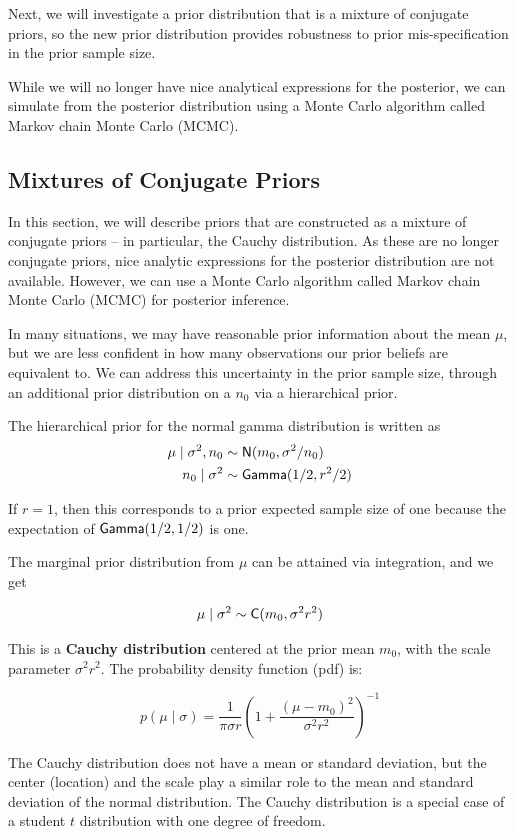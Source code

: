 \documentclass[]{book}
\theoremstyle{definition}
\theoremstyle{definition}
\theoremstyle{definition}
\theoremstyle{remark}
\begin{document}
Next, we will investigate a prior distribution that is a mixture of
conjugate priors, so the new prior distribution provides robustness to
prior mis-specification in the prior sample size.

While we will no longer have nice analytical expressions for the
posterior, we can simulate from the posterior distribution using a Monte
Carlo algorithm called Markov chain Monte Carlo (MCMC).

\subsection{Mixtures of Conjugate Priors}\label{sec:NG-Cauchy}

In this section, we will describe priors that are constructed as a
mixture of conjugate priors -- in particular, the Cauchy distribution.
As these are no longer conjugate priors, nice analytic expressions for
the posterior distribution are not available. However, we can use a
Monte Carlo algorithm called Markov chain Monte Carlo (MCMC) for
posterior inference.

In many situations, we may have reasonable prior information about the
mean \(\mu\), but we are less confident in how many observations our
prior beliefs are equivalent to. We can address this uncertainty in the
prior sample size, through an additional prior distribution on a \(n_0\)
via a hierarchical prior.

The hierarchical prior for the normal gamma distribution is written as
\[\begin{aligned}
\mu \mid \sigma^2, n_0 & \sim \textsf{N}(m_0, \sigma^2/n_0) \\
n_0 \mid \sigma^2 &  \sim \textsf{Gamma}(1/2, r^2/2)
\end{aligned}\]

If \(r=1\), then this corresponds to a prior expected sample size of one
because the expectation of \(\textsf{Gamma}(1/2,1/2)\) is one.

The marginal prior distribution from \(\mu\) can be attained via
integration, and we get

\[\mu \mid \sigma^2  \sim  \textsf{C}(m_0, \sigma^2 r^2)\]

This is a \textbf{Cauchy distribution} centered at the prior mean
\(m_0\), with the scale parameter \(\sigma^2 r^2\). The probability
density function (pdf) is:

\[p(\mu \mid \sigma) = \frac{1}{\pi \sigma r} \left( 1 +  \frac{(\mu - m_0)^2} {\sigma^2 r^2}  \right)^{-1}\]

The Cauchy distribution does not have a mean or standard deviation, but
the center (location) and the scale play a similar role to the mean and
standard deviation of the normal distribution. The Cauchy distribution
is a special case of a student \(t\) distribution with one degree of
freedom.
\end{document}
